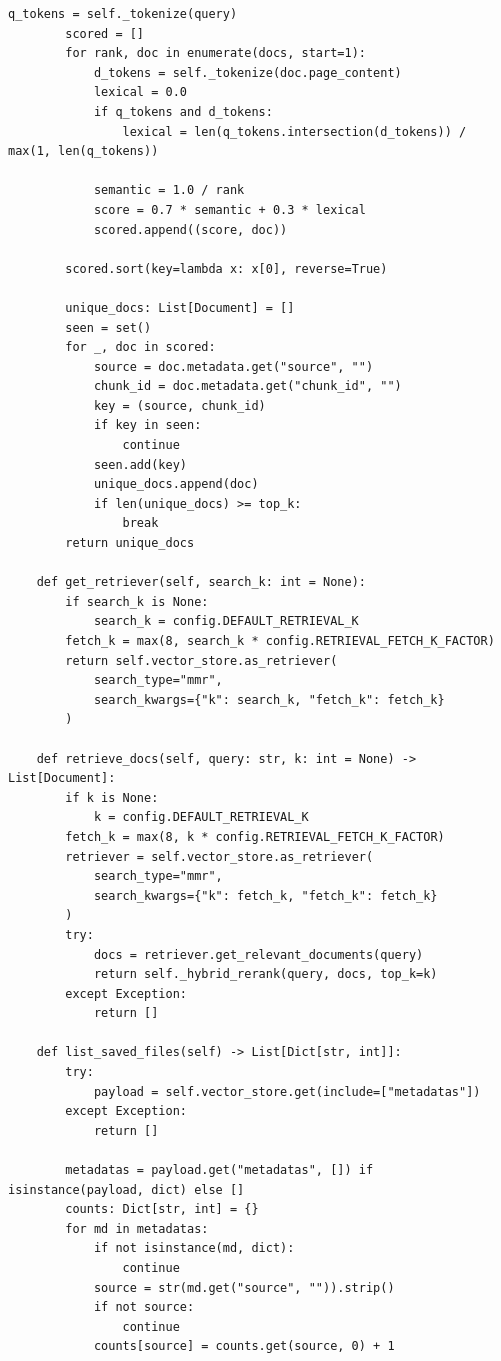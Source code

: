 \documentclass[12pt,a4paper]{article}
\begin{document}
\begin{lstlisting}[caption={database.py}]
        q_tokens = self._tokenize(query)
        scored = []
        for rank, doc in enumerate(docs, start=1):
            d_tokens = self._tokenize(doc.page_content)
            lexical = 0.0
            if q_tokens and d_tokens:
                lexical = len(q_tokens.intersection(d_tokens)) / max(1, len(q_tokens))

            semantic = 1.0 / rank
            score = 0.7 * semantic + 0.3 * lexical
            scored.append((score, doc))

        scored.sort(key=lambda x: x[0], reverse=True)

        unique_docs: List[Document] = []
        seen = set()
        for _, doc in scored:
            source = doc.metadata.get("source", "")
            chunk_id = doc.metadata.get("chunk_id", "")
            key = (source, chunk_id)
            if key in seen:
                continue
            seen.add(key)
            unique_docs.append(doc)
            if len(unique_docs) >= top_k:
                break
        return unique_docs

    def get_retriever(self, search_k: int = None):
        if search_k is None:
            search_k = config.DEFAULT_RETRIEVAL_K
        fetch_k = max(8, search_k * config.RETRIEVAL_FETCH_K_FACTOR)
        return self.vector_store.as_retriever(
            search_type="mmr",
            search_kwargs={"k": search_k, "fetch_k": fetch_k}
        )

    def retrieve_docs(self, query: str, k: int = None) -> List[Document]:
        if k is None:
            k = config.DEFAULT_RETRIEVAL_K
        fetch_k = max(8, k * config.RETRIEVAL_FETCH_K_FACTOR)
        retriever = self.vector_store.as_retriever(
            search_type="mmr",
            search_kwargs={"k": fetch_k, "fetch_k": fetch_k}
        )
        try:
            docs = retriever.get_relevant_documents(query)
            return self._hybrid_rerank(query, docs, top_k=k)
        except Exception:
            return []

    def list_saved_files(self) -> List[Dict[str, int]]:
        try:
            payload = self.vector_store.get(include=["metadatas"])
        except Exception:
            return []

        metadatas = payload.get("metadatas", []) if isinstance(payload, dict) else []
        counts: Dict[str, int] = {}
        for md in metadatas:
            if not isinstance(md, dict):
                continue
            source = str(md.get("source", "")).strip()
            if not source:
                continue
            counts[source] = counts.get(source, 0) + 1


\end{lstlisting}
\end{document}
